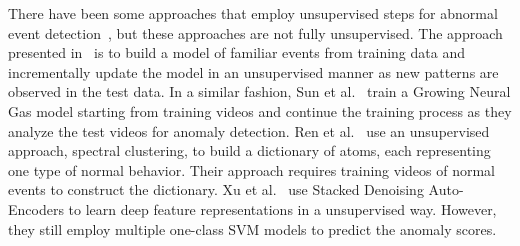 \documentclass[10pt,twocolumn,letterpaper]{article}
\begin{document}
There have been some approaches that employ unsupervised steps for abnormal event detection~\cite{Dutta-AAAI-2015,Ren-BMVC-2015,Sun-PR-2017,Xu-BMVC-2015}, but these approaches are not fully unsupervised. The approach presented in~\cite{Dutta-AAAI-2015} is to build a model of familiar events from training data and incrementally update the model in an unsupervised manner as new patterns are observed in the test data. In a similar fashion, Sun et al.~\cite{Sun-PR-2017} train a Growing Neural Gas model starting from training videos and continue the training process as they analyze the test videos for anomaly detection. Ren et al.~\cite{Ren-BMVC-2015} use an unsupervised approach, spectral clustering, to build a dictionary of atoms, each representing one type of normal behavior. Their approach requires training videos of normal events to construct the dictionary. Xu et al.~\cite{Xu-BMVC-2015} use Stacked Denoising Auto-Encoders to learn deep feature representations in a unsupervised way. However, they still employ multiple one-class SVM models to predict the anomaly scores. 
\end{document}
